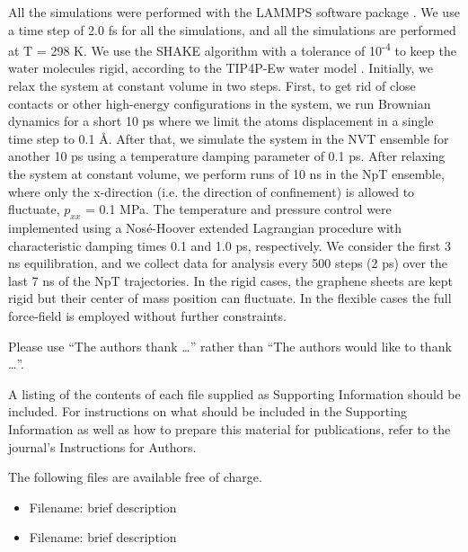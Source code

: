 \documentclass[journal=acsnano,manuscript=article]{achemso}
\begin{document}
	All the simulations were performed with the LAMMPS software package \cite{Plimpton1995}. We use a time step of 2.0 fs for all the simulations, and all the simulations are performed at T = 298 K. We use the SHAKE algorithm \cite{Andersen1983} with a tolerance of 10\textsuperscript{-4} to keep the water molecules rigid, according to the TIP4P-Ew water model \cite{Horn2004}. Initially, we relax the system at constant volume in two steps. First, to get rid of close contacts or other high-energy configurations in the system, we run Brownian dynamics \cite{Schneider1978} for a short 10 ps where we limit the atoms displacement in a single time step to 0.1 \r A. After that, we simulate the system in the NVT ensemble for another 10 ps using a temperature damping parameter of 0.1 ps. After relaxing the system at constant volume, we perform runs of 10 ns in the NpT ensemble, where only the x-direction (i.e. the direction of confinement) is allowed to fluctuate, \(p_{xx}\) = 0.1 MPa. The temperature and pressure control were implemented using a Nos\' e-Hoover extended Lagrangian procedure \cite{Martyna1994} with characteristic damping times 0.1 and 1.0 ps, respectively. We consider the first 3 ns equilibration, and we collect data for analysis every 500 steps (2 ps) over the last 7 ns of the NpT trajectories. In the rigid cases, the graphene sheets are kept rigid but their center of mass position can fluctuate. In the flexible cases the full force-field is employed without further constraints.


\begin{acknowledgement}

Please use ``The authors thank \ldots'' rather than ``The
authors would like to thank \ldots''.

\end{acknowledgement}

\begin{suppinfo}

A listing of the contents of each file supplied as Supporting Information
should be included. For instructions on what should be included in the
Supporting Information as well as how to prepare this material for
publications, refer to the journal's Instructions for Authors.

The following files are available free of charge.
\begin{itemize}
  \item Filename: brief description
  \item Filename: brief description
\end{itemize}

\end{suppinfo}
\end{document}
